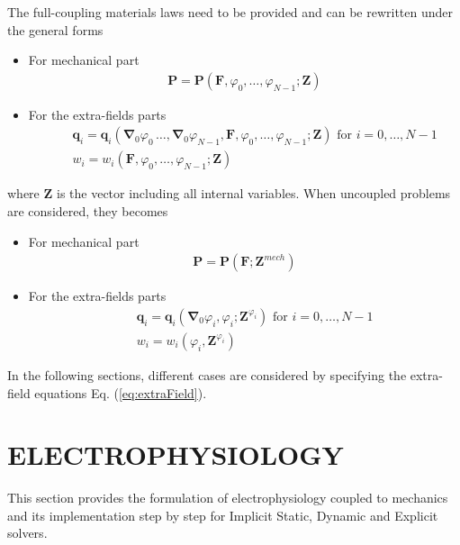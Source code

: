 \documentclass[oneside,11pt,times]{book}
\begin{document}
The full-coupling materials laws need to be provided and can be rewritten under the general forms
\begin{itemize}
	\item For mechanical part
	\begin{eqnarray*}
		\mathbf{P}=\mathbf{P}\left(\mathbf{F},\varphi_0, \ldots,\varphi_{N-1}; \mathbf{Z} \right)
	\end{eqnarray*}
	\item  For the extra-fields parts
	\begin{eqnarray*}
		&&\mathbf{q}_i=\mathbf{q}_i\left(\bm{\nabla}_0 \varphi_0\,\ldots,\bm{\nabla}_0 \varphi_{N-1}, \mathbf{F},\varphi_0, \ldots,\varphi_{N-1}; \mathbf{Z} \right) \text{ for } i =0,\ldots,N-1 \\
		&&w_i = w_i\left( \mathbf{F},\varphi_0, \ldots,\varphi_{N-1}; \mathbf{Z}\right)
	\end{eqnarray*}
\end{itemize}
where $\mathbf{Z}$ is the vector including all internal variables. When uncoupled problems are considered, they becomes
\begin{itemize}
	\item For mechanical part
	\begin{eqnarray*}
		\mathbf{P}=\mathbf{P}\left(\mathbf{F}; \mathbf{Z}^{mech} \right)
	\end{eqnarray*}
	\item  For the extra-fields parts
	\begin{eqnarray*}
		&&\mathbf{q}_i=\mathbf{q}_i\left(\bm{\nabla}_0 \varphi_i,\varphi_i; \mathbf{Z}^{\varphi_i} \right) \text{ for } i =0,\ldots,N-1 \\
		&&w_i = w_i\left(\varphi_i,\mathbf{Z}^{\varphi_i}\right)
	\end{eqnarray*}
\end{itemize}
In the following sections, different cases are considered by specifying the extra-field equations Eq. (\ref{eq:extraField}).


\section{ELECTROPHYSIOLOGY}

This section provides the formulation of electrophysiology coupled to mechanics and its implementation step by step for Implicit Static, Dynamic and Explicit solvers.
\\
\end{document}
